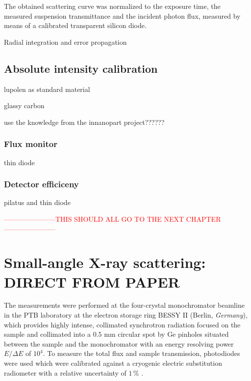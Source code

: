 The obtained scattering curve was normalized to the exposure time, the measured suspension transmittance and the incident photon flux, measured by means of a calibrated transparent silicon diode. 

Radial integration and error propagation

\subsection{Absolute intensity calibration}

lupolen as standard material \cite{kratky_absolute_1966,shaffer_calibration_1974}

glassy carbon \cite{perret_glassy_1972}

use the knowledge from the innanopart project??????
\subsubsection{Flux monitor}
thin diode
\subsubsection{Detector efficiceny}
pilatus and thin diode





















\textcolor{red}{-----------------------THIS SHOULD ALL GO TO THE NEXT CHAPTER-----------------------}











\section{Small-angle X-ray scattering: DIRECT FROM PAPER}
The measurements were performed at the four-crystal monochromator beamline in the PTB laboratory at the electron storage ring BESSY II (Berlin, \emph{Germany}), which provides highly intense, collimated synchrotron radiation focused on the sample and collimated into a \(0.5\) mm circular spot by Ge pinholes situated between the sample and the monochromator with an energy resolving power \( E/\Delta E \) of \( 10^4 \). To measure the total flux and sample transmission, photodiodes were used which were calibrated against a cryogenic electric substitution radiometer with a relative uncertainty of \( 1\,\% \) \cite{krumrey_high-accuracy_2001}.


